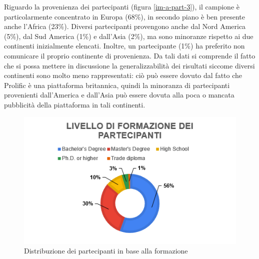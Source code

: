 Riguardo la provenienza dei partecipanti (figura \ref{im-a-part-3}), il campione è particolarmente concentrato in Europa (68\%), in secondo piano è ben presente anche l'Africa (23\%). Diversi partecipanti provengono anche dal Nord America (5\%), dal Sud America (1\%) e dall'Asia (2\%), ma sono minoranze rispetto ai due continenti inizialmente elencati. Inoltre, un partecipante (1\%) ha preferito non comunicare il proprio continente di provenienza. Da tali dati si comprende il fatto che si possa mettere in discussione la generalizzabilità dei risultati siccome diversi continenti sono molto meno rappresentati: ciò può essere dovuto dal fatto che Prolific è una piattaforma britannica, quindi la minoranza di partecipanti provenienti dall'America e dall'Asia può essere dovuta alla poca o mancata pubblicità della piattaforma in tali continenti.\\

\begin{figure}[h!]
    \centering
    \includegraphics[width=1\textwidth]{figure/data-analysis/formazione.png}
    \caption{Distribuzione dei partecipanti in base alla formazione}
    \label{im-a-part-4}
\end{figure}

